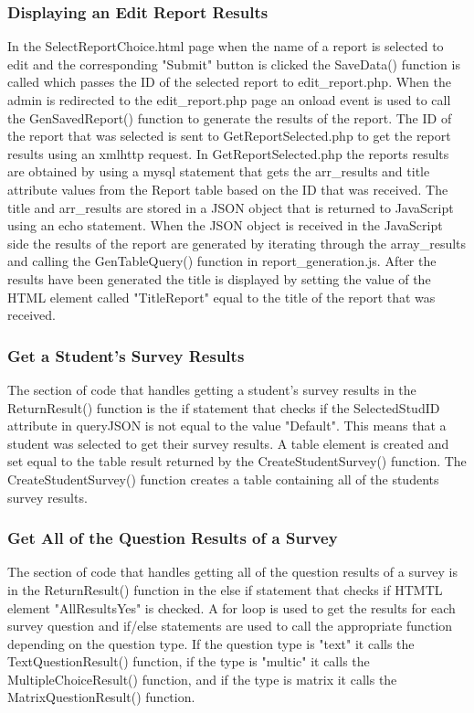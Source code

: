 \documentclass[../final.tex]{subfiles}
\begin{document}
	\subsubsection{Displaying an Edit Report Results}
	In the SelectReportChoice.html page when the name of a report is selected to edit and the corresponding "Submit" button is clicked the SaveData() function is called which passes the ID of the selected report to edit\_report.php. When the admin is redirected to the edit\_report.php page an onload event is used to call the GenSavedReport() function to generate the results of the report. The ID of the report that was selected is sent to GetReportSelected.php to get the report results using an xmlhttp request. In GetReportSelected.php the reports results are obtained by using a mysql statement that gets the arr\_results and title attribute values from the Report table based on the ID that was received. The title and arr\_results are stored in a JSON object that is returned to JavaScript using an echo statement. When the JSON object is received in the JavaScript side the results of the report are generated by iterating through the array\_results and calling the GenTableQuery() function in report\_generation.js. After the results have been generated the title is displayed by setting the value of the HTML element called "TitleReport" equal to the title of the report that was received. 
	
	\subsubsection{Get a Student's Survey Results}
	The section of code that handles getting a student's survey results in the ReturnResult() function is the if statement that checks if the SelectedStudID attribute in queryJSON is not equal to the value "Default". This means that a student was selected to get their survey results. A table element is created and set equal to the table result returned by the CreateStudentSurvey() function. The CreateStudentSurvey() function creates a table containing all of the students survey results.
	
	\subsubsection{Get All of the Question Results of a Survey}
	The section of code that handles getting all of the question results of a survey is in the ReturnResult() function in the else if statement that checks if HTMTL element "AllResultsYes" is checked. A for loop is used to get the results for each survey question and if/else statements are used to call the appropriate function depending on the question type. If the question type is "text" it calls the TextQuestionResult() function, if the type is "multic" it calls the MultipleChoiceResult() function, and if the type is matrix it calls the MatrixQuestionResult() function. 
		
\end{document}
